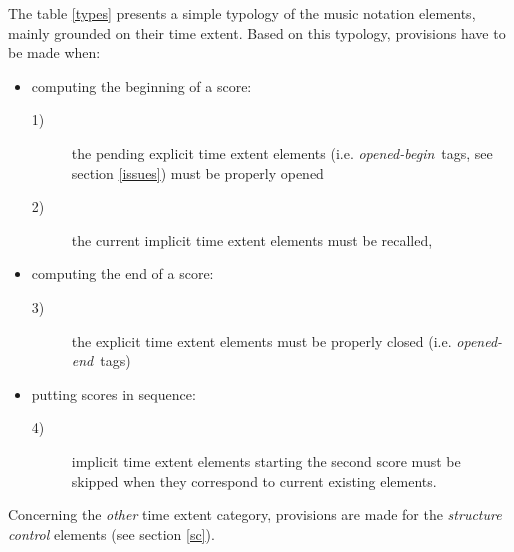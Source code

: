 \documentclass[twoside,10pt,a4paper]{article}
\newcommand{\oend}		{\emph{opened-end}}
\newcommand{\obeg}		{\emph{opened-begin}}
\begin{document}
The table \ref{types} presents a simple typology of the music notation elements, mainly grounded on their time extent.
Based on this typology, provisions have to be made when:
\begin{itemize}
\item computing the beginning of a score:  
\begin{description}
	\item[1)] the pending explicit time extent elements (i.e. \obeg\ tags, see section \ref{issues}) must be properly opened 
	\item[2)] the current implicit time extent elements must be recalled,
\end{description}
\item computing the end of a score: 
\begin{description}
	\item[3)] the explicit time extent elements must be properly closed (i.e. \oend\ tags)
\end{description}
\item putting scores in sequence: 
\begin{description}
	\item[4)] implicit time extent elements starting the second score must be skipped when they correspond to current existing elements.
\end{description}
\end{itemize}
Concerning the \emph{other} time extent category, provisions are made for the \emph{structure control} elements (see section \ref{sc}).

\end{document}
